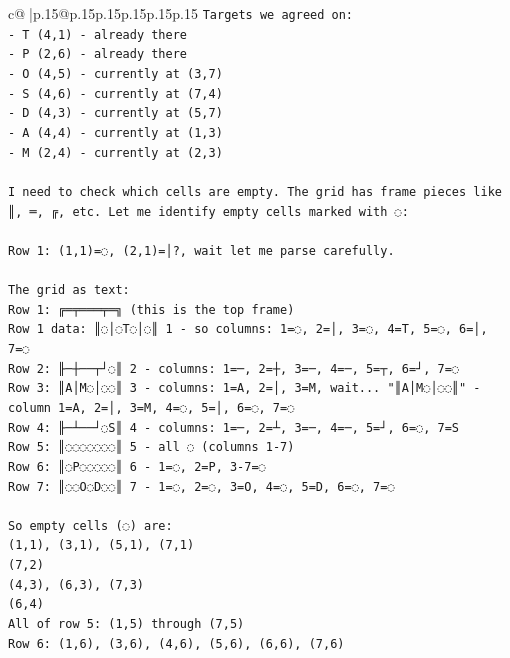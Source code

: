 \documentclass{article}
\begin{document}
{\begin{supertabular}{c@{$\;$}|p{.15\linewidth}@{}p{.15\linewidth}p{.15\linewidth}p{.15\linewidth}p{.15\linewidth}p{.15\linewidth}}
{{{\texttt{Targets we agreed on:} \\
\texttt{{-} T (4,1) {-} already there} \\
\texttt{{-} P (2,6) {-} already there} \\
\texttt{{-} O (4,5) {-} currently at (3,7)} \\
\texttt{{-} S (4,6) {-} currently at (7,4)} \\
\texttt{{-} D (4,3) {-} currently at (5,7)} \\
\texttt{{-} A (4,4) {-} currently at (1,3)} \\
\texttt{{-} M (2,4) {-} currently at (2,3)} \\
\\ 
\texttt{I need to check which cells are empty. The grid has frame pieces like ║, ═, ╔, etc. Let me identify empty cells marked with ◌:} \\
\\ 
\texttt{Row 1: (1,1)=◌, (2,1)=│?, wait let me parse carefully.} \\
\\ 
\texttt{The grid as text:} \\
\texttt{Row 1: ╔═╤═══╤═╗ (this is the top frame)} \\
\texttt{Row 1 data: ║◌│◌T◌│◌║ 1 {-} so columns: 1=◌, 2=│, 3=◌, 4=T, 5=◌, 6=│, 7=◌} \\
\texttt{Row 2: ╟─┼──┬┘◌║ 2 {-} columns: 1=─, 2=┼, 3=─, 4=─, 5=┬, 6=┘, 7=◌} \\
\texttt{Row 3: ║A│M◌│◌◌║ 3 {-} columns: 1=A, 2=│, 3=M, wait... "║A│M◌│◌◌║" {-} column 1=A, 2=│, 3=M, 4=◌, 5=│, 6=◌, 7=◌} \\
\texttt{Row 4: ╟─┴──┘◌S║ 4 {-} columns: 1=─, 2=┴, 3=─, 4=─, 5=┘, 6=◌, 7=S} \\
\texttt{Row 5: ║◌◌◌◌◌◌◌║ 5 {-} all ◌ (columns 1{-}7)} \\
\texttt{Row 6: ║◌P◌◌◌◌◌║ 6 {-} 1=◌, 2=P, 3{-}7=◌} \\
\texttt{Row 7: ║◌◌O◌D◌◌║ 7 {-} 1=◌, 2=◌, 3=O, 4=◌, 5=D, 6=◌, 7=◌} \\
\\ 
\texttt{So empty cells (◌) are:} \\
\texttt{(1,1), (3,1), (5,1), (7,1)} \\
\texttt{(7,2)} \\
\texttt{(4,3), (6,3), (7,3)} \\
\texttt{(6,4)} \\
\texttt{All of row 5: (1,5) through (7,5)} \\
\texttt{Row 6: (1,6), (3,6), (4,6), (5,6), (6,6), (7,6)} \\
}}}
\end{supertabular}}
\end{document}
